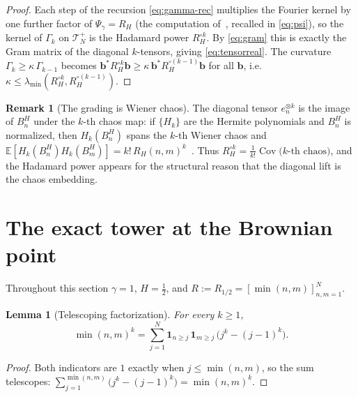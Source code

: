 \documentclass[11pt,reqno]{amsart}
\theoremstyle{plain}
\newtheorem{lemma}[theorem]{Lemma}
\theoremstyle{definition}
\newtheorem{remark}[theorem]{Remark}
\newcommand{\E}{\mathbb{E}}
\newcommand{\Had}{\mathbin{\circ}}     %
\newcommand{\Bm}{B^{H}}
\DeclareMathOperator{\Cov}{Cov}
\newcommand{\Gam}{\Gamma}
\begin{document}
\begin{proof}
Each step of the recursion \eqref{eq:gamma-rec} multiplies the Fourier kernel by
one further factor of $\Psi_\gamma=R_H$ (the computation of~\cite{FontesPartI},
recalled in \eqref{eq:psi}), so the kernel of $\Gam_k$ on $\mathcal T_N^{+}$ is
the Hadamard power $R_H^{\Had k}$. By \eqref{eq:gram} this is exactly the Gram
matrix of the diagonal $k$-tensors, giving \eqref{eq:tensorreal}. The curvature
$\Gam_k\ge\kappa\,\Gam_{k-1}$ becomes
$\mathbf b^{*}R_H^{\Had k}\mathbf b\ge\kappa\,\mathbf b^{*}R_H^{\Had(k-1)}\mathbf b$
for all $\mathbf b$, i.e.\ $\kappa\le\lambda_{\min}(R_H^{\Had k},R_H^{\Had(k-1)})$.
\end{proof}

\begin{remark}[The grading is Wiener chaos]\label{rem:chaos}
The diagonal tensor $e_n^{\otimes k}$ is the image of $\Bm_n$ under the $k$-th
chaos map: if $\{H_k\}$ are the Hermite polynomials and $\Bm_n$ is normalized,
then $H_k(\Bm_n)$ spans the $k$-th Wiener chaos and
$\E[H_k(\Bm_n)H_k(\Bm_m)]=k!\,R_H(n,m)^{k}$~\cite{Nualart}. Thus
$R_H^{\Had k}=\tfrac1{k!}
\Cov\!\bigl(k\text{-th chaos}\bigr)$, and the Hadamard power appears for the
structural reason that the diagonal lift is the chaos embedding.
\end{remark}

\section{The exact tower at the Brownian point}\label{sec:tower}

Throughout this section $\gamma=1$, $H=\tfrac12$, and
$R:=R_{1/2}=[\min(n,m)]_{n,m=1}^{N}$.

\begin{lemma}[Telescoping factorization]\label{lem:telescope}
For every $k\ge1$,
\begin{equation}\label{eq:telescope}
  \min(n,m)^{k}=\sum_{j=1}^{N}\mathbf 1_{n\ge j}\,\mathbf 1_{m\ge j}\,
  \bigl(j^{k}-(j-1)^{k}\bigr).
\end{equation}
\end{lemma}

\begin{proof}
Both indicators are $1$ exactly when $j\le\min(n,m)$, so the sum telescopes:
$\sum_{j=1}^{\min(n,m)}\bigl(j^{k}-(j-1)^{k}\bigr)=\min(n,m)^{k}$.
\end{proof}
\end{document}
